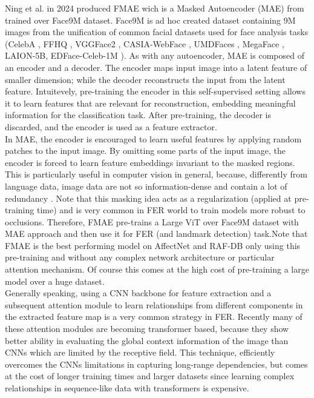 Ning et al. in 2024 \cite{RW_12A_FMAE} produced FMAE wich is a Masked Autoencoder (MAE) from \cite{RW_12B_MAE} trained over Face9M dataset. Face9M is ad hoc created dataset containing 9M images from the unification of common facial datasets used for face analysis tasks (CelebA \cite{CelebA}, FFHQ \cite{FFHQ}, VGGFace2 \cite{VGGFace2}, CASIA-WebFace \cite{CASIA-WebFace}, UMDFaces \cite{UMDFaces}, MegaFace \cite{MegaFace}, LAION-5B\cite{LAION-5B}, EDFace-Celeb-1M \cite{EDFace-Celeb-1M}). 
As with any autoencoder, MAE is composed of an encoder and a decoder. The encoder maps input image into a latent feature of smaller dimension; while the decoder reconstructs the input from the latent feature. Intuitevely, pre-training the encoder in this self-supervised setting allows it to learn features that are relevant for reconstruction, embedding meaningful information for the classification task. After pre-training, the decoder is discarded, and the encoder is used as a feature extractor.\\

In MAE, the encoder is encouraged to learn useful features by applying random patches to the input image. By omitting some parts of the input image, the encoder is forced to learn feature embeddings invariant to the masked regions. This is particularly useful in computer vision in general, because, differently from language data, image data are not so information-dense and contain a lot of redundancy \cite{RW_12B_MAE}.
Note that this masking idea acts as a regularization (applied at pre-training time) and is very common in FER world to train models more robust to occlusions.\cite{RW_12A_FMAE} 
Therefore, FMAE \cite{RW_12A_FMAE} pre-trains a Large ViT \cite{Vision_Transformer} over Face9M dataset with MAE approach and then use it for FER (and landmark detection) task.Note that FMAE is the best performing model on AffectNet \cite{AffectNet} and RAF-DB \cite{RAFDB} only using this pre-training and without any complex network architecture or particular attention mechanism. Of course this comes at the high cost of pre-training a large model over a huge dataset.\\

 Generally speaking, using a CNN backbone for feature extraction and a subsequent attention module to learn relationships from different components in the extracted feature map is a very common strategy in FER. Recently many of these attention modules are becoming transformer based, because they show better ability in evaluating the global context information of the image than CNNs which are limited by the receptive field. This technique, efficiently overcomes the CNNs limitations in capturing long-range dependencies, but comes at the cost of longer training times and larger datasets since learning complex relationships in sequence-like data with transformers is expensive.\\

